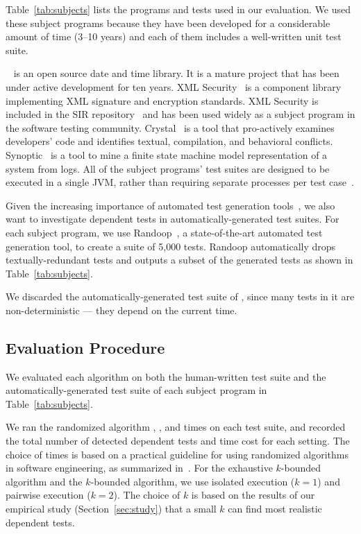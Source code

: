 Table~\ref{tab:subjects} lists the programs and
tests used in our evaluation. We used these subject
programs because they have been developed for
a considerable amount of time (3--10 years) and each
of them includes a well-written unit test suite.

\jt~\cite{jodatime} is an open source
date and time library. It is a mature project that
has been under active development
for ten years. XML Security~\cite{xmlsecurity}
is a component library implementing XML signature and encryption
standards. XML Security is included in
the SIR repository~\cite{sir} and has been used widely
as a subject program in the software testing community.
Crystal~\cite{crystal} is a tool that
pro-actively examines developers' code and
identifies textual, compilation, and behavioral conflicts.
Synoptic~\cite{synoptic} is a tool to mine a finite state
machine model representation of a system from logs.
All of the subject programs' test suites are designed to be executed in
a single JVM, rather than requiring separate processes per test case~\cite{vmvm}.

Given the increasing importance of automated test generation
tools~\cite{PachecoLET2007, ZhangSBE2011, Csallner:2004, fraseretal:ISSTA:2011},
we also want to investigate dependent tests in automatically-generated
test suites. For each subject program, we use
Randoop~\cite{PachecoLET2007}, a state-of-the-art automated
test generation tool, to create a suite of 5,000 tests.
Randoop automatically drops textually-redundant tests 
and outputs a subset of the generated tests as
shown in Table~\ref{tab:subjects}.

We discarded the automatically-generated test suite of
\jt, since many tests in it are non-deterministic ---
they depend on the current time.


\subsection{Evaluation Procedure}

We evaluated each algorithm 
on both the human-written test suite 
and the automatically-generated test suite
of each subject program in Table~\ref{tab:subjects}.


We ran the randomized algorithm \smalltrialnum, \mediumtrialnum,
and \trialnum times on each test suite, and recorded
the total number of detected dependent tests and time cost
for each setting. The choice of \trialnum times is based
on a practical guideline for using randomized algorithms
in software engineering, as summarized in~\cite{Arcuri:2011}.
%
For the exhaustive $k$-bounded algorithm
and the \dependenceaware{} $k$-bounded algorithm,
we use isolated execution ($k = 1$) and
pairwise execution ($k = 2$). The choice of $k$ is
based on the results of our empirical
study (Section~\ref{sec:study}) that a small $k$
can find most realistic dependent tests.

